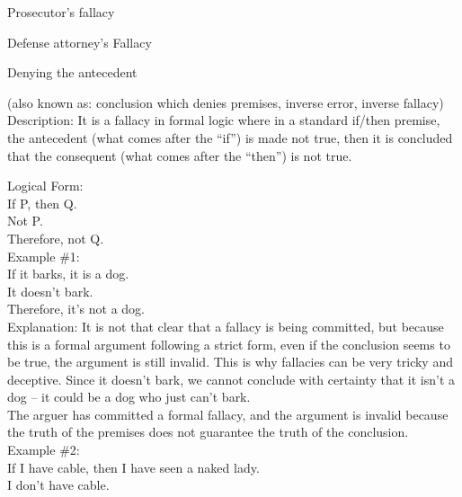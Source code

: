 \documentclass[a4paper,12pt,single,pdftex]{scrartcl}
\begin{document}
Prosecutor's fallacy

Defense attorney's Fallacy

Denying the antecedent
    
      (also known as: conclusion which denies premises, inverse error, inverse fallacy)
    \\

  
    Description: It is a fallacy in formal logic where in a standard if/then premise, the antecedent (what comes after the “if”) is made not true, then it is concluded that the consequent (what comes after the “then”) is not true.

    
      Logical Form:
    \\

    
      If P, then Q.
    \\

    
      Not P.
    \\

    
      Therefore, not Q.
    \\

    
      Example \#1:
    \\

    
      If it barks, it is a dog.
    \\

    
      It doesn’t bark.
    \\

    
      Therefore, it’s not a dog.
    \\

    
      Explanation: It is not that clear that a fallacy is being committed, but because this is a formal argument following a strict form, even if the conclusion seems to be true, the argument is still invalid.  This is why fallacies can be very tricky and deceptive.  Since it doesn’t bark, we cannot conclude with certainty that it isn’t a dog -- it could be a dog who just can’t bark.
    \\

    
      The arguer has committed a formal fallacy, and the argument is invalid because the truth of the premises does not guarantee the truth of the conclusion.
    \\

    
      Example \#2:
    \\

    
      If I have cable, then I have seen a naked lady.
    \\

    
      I don’t have cable.
    \\
\end{document}
